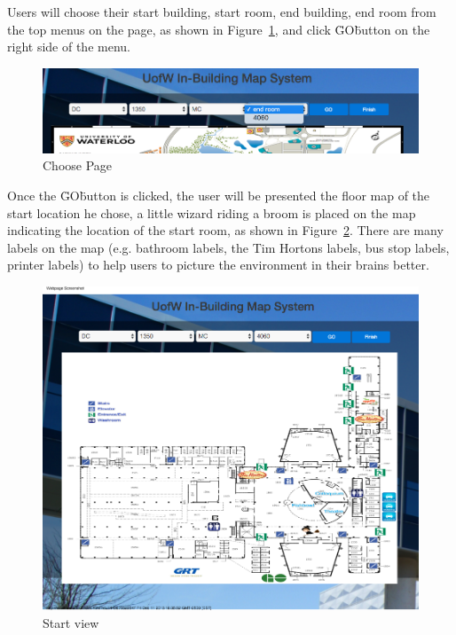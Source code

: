 \documentclass{sigchi}
\begin{document}
Users will choose their start building, start room, end building, end room from the top menus on the page, as shown in Figure~\ref{fig:choose_page}, and click \"GO\" button on the right side of the menu.


\begin{figure}[!h]
\centering
\includegraphics[width=1.0\columnwidth]{pics/choose_page.png}
\caption{Choose Page}
\label{fig:choose_page}
\end{figure}


Once the \"GO\" button is clicked, the user will be presented the floor map of the start location he chose, a little wizard riding a broom is placed on the map indicating the location of the start room, as shown in Figure~\ref{fig:map0}. There are many labels on the map (e.g. bathroom labels, the Tim Hortons labels, bus stop labels, printer labels) to help users to picture the environment in their brains better. 

\begin{figure}[!h]
\centering
\includegraphics[width=1.0\columnwidth]{pics/map0.png}
\caption{Start view}
\label{fig:map0}
\end{figure}
\end{document}
